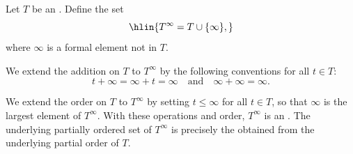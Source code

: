\begin{definition} \label{definition:ordered_monoid_with_adjoined_infinity}
    Let $T$ be an . Define the set
    $$\hlin{T^\infty = T \cup \{\infty\},}$$
    where $\infty$ is a formal element not in $T$.

    We extend the addition on $T$ to $T^\infty$ by the following conventions for all $t \in T$:
    $$t + \infty = \infty + t = \infty \quad \text{and} \quad \infty + \infty = \infty.$$

    We extend the order on $T$ to $T^\infty$ by setting $t \leq \infty$ for all $t \in T$, so that $\infty$ is the largest element of $T^\infty$. With these operations and order, $T^\infty$ is an . The underlying partially ordered set of $T^\infty$ is precisely the  obtained from the underlying partial order of $T$.
\end{definition}